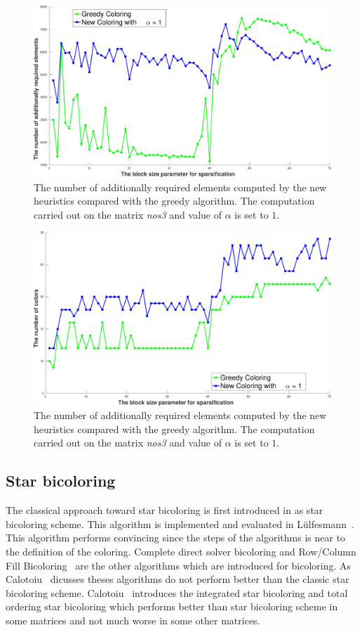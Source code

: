 \documentclass[12pt, twoside,a4paper,toc=bibliography]{scrbook}
\begin{document}
\begin{figure}
\centering
\includegraphics[width=0.9\linewidth]{bls_add_alpha_1_nos3}
\caption{The number of additionally required elements computed
by the new heuristics compared with the
greedy algorithm. The computation carried out on the matrix
\textit{nos3} and value of $\alpha$ is
set to $1$.}
\label{new.col.add.alpha.one.nos3}
\end{figure}
\begin{figure}
\centering
\includegraphics[width=0.9\linewidth]{bls_col_alpha_1_nos3}
\caption{The number of additionally required elements computed
by the new heuristics compared with the greedy algorithm.
The computation carried out on the matrix \textit{nos3}
and value of $\alpha$ is set to $1$.}
\label{new.col.col.alpha.one.nos3}
\end{figure}

\subsection{Star bicoloring}
\label{s.heuristic.starbicoloring}
The classical approach toward star bicoloring is first introduced in
\cite{Gebremedhin05whatcolor} as star bicoloring scheme.
This algorithm is implemented and evaluated in
Lülfesmann~\cite{LulfesmannMaster}. This algorithm performs convincing
since the steps of the algorithms is near to the definition of the coloring.
Complete direct solver bicoloring and Row/Column Fill Bicoloring~\cite{Hossain95computinga}
are the other algorithms which are introduced for bicoloring.
As Calotoiu~\cite{CalotoiuMaster} dicusses theses algorithms do not perform
better than the classic star bicoloring scheme.
Calotoiu~\cite{CalotoiuMaster} introduces the integrated star bicoloring
and total ordering star bicoloring which performs better than
star bicoloring scheme in some matrices and not much worse in some other
matrices.
\end{document}
